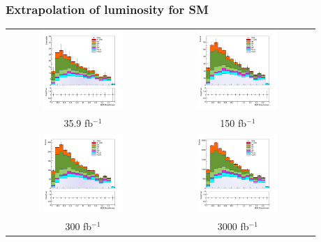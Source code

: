 \documentclass[11pt]{beamer}
\newcommand{\nologo}{\setbeamertemplate{logo}{}}
\begin{document}
{\nologo
	\begin{frame}
	\frametitle{Extrapolation of luminosity for SM }
	\begin{center}
		\begin{tabular}{cc}
			\includegraphics[width=5.5cm,height=3cm]{figures/simple.png} &
			\includegraphics[width=5.5cm,height=3cm]{figures/150fb/simple-150.png}\\ 
			\scriptsize{35.9 fb$^{-1}$} & \scriptsize{150 fb$^{-1}$} \\
			\includegraphics[width=5.5cm,height=3cm]{figures/300fb/simple-300.png}&
			\includegraphics[width=5.5cm,height=3cm]{figures/3000fb/simple-3000.png}\\
			\scriptsize{300 fb$^{-1}$} & \scriptsize{3000 fb$^{-1}$} \\
		\end{tabular}
	\end{center}
\end{frame}
}
\end{document}

